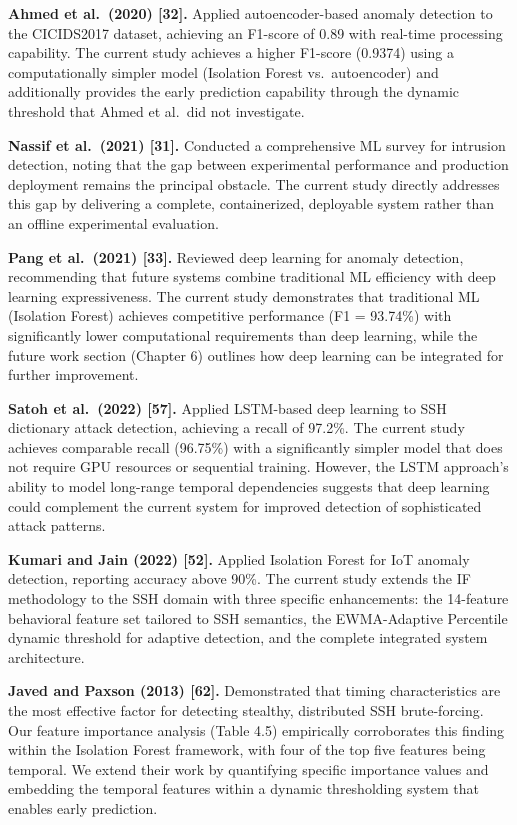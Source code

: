 \documentclass[
  a4paper]{report}
\begin{document}
\textbf{Ahmed et al.~(2020) {[}32{]}.} Applied autoencoder-based anomaly
detection to the CICIDS2017 dataset, achieving an F1-score of 0.89 with
real-time processing capability. The current study achieves a higher
F1-score (0.9374) using a computationally simpler model (Isolation
Forest vs.~autoencoder) and additionally provides the early prediction
capability through the dynamic threshold that Ahmed et al.~did not
investigate.

\textbf{Nassif et al.~(2021) {[}31{]}.} Conducted a comprehensive ML
survey for intrusion detection, noting that the gap between experimental
performance and production deployment remains the principal obstacle.
The current study directly addresses this gap by delivering a complete,
containerized, deployable system rather than an offline experimental
evaluation.

\textbf{Pang et al.~(2021) {[}33{]}.} Reviewed deep learning for anomaly
detection, recommending that future systems combine traditional ML
efficiency with deep learning expressiveness. The current study
demonstrates that traditional ML (Isolation Forest) achieves competitive
performance (F1 = 93.74\%) with significantly lower computational
requirements than deep learning, while the future work section (Chapter
6) outlines how deep learning can be integrated for further improvement.

\textbf{Satoh et al.~(2022) {[}57{]}.} Applied LSTM-based deep learning
to SSH dictionary attack detection, achieving a recall of 97.2\%. The
current study achieves comparable recall (96.75\%) with a significantly
simpler model that does not require GPU resources or sequential
training. However, the LSTM approach's ability to model long-range
temporal dependencies suggests that deep learning could complement the
current system for improved detection of sophisticated attack patterns.

\textbf{Kumari and Jain (2022) {[}52{]}.} Applied Isolation Forest for
IoT anomaly detection, reporting accuracy above 90\%. The current study
extends the IF methodology to the SSH domain with three specific
enhancements: the 14-feature behavioral feature set tailored to SSH
semantics, the EWMA-Adaptive Percentile dynamic threshold for adaptive
detection, and the complete integrated system architecture.

\textbf{Javed and Paxson (2013) {[}62{]}.} Demonstrated that timing
characteristics are the most effective factor for detecting stealthy,
distributed SSH brute-forcing. Our feature importance analysis (Table
4.5) empirically corroborates this finding within the Isolation Forest
framework, with four of the top five features being temporal. We extend
their work by quantifying specific importance values and embedding the
temporal features within a dynamic thresholding system that enables
early prediction.
\end{document}
